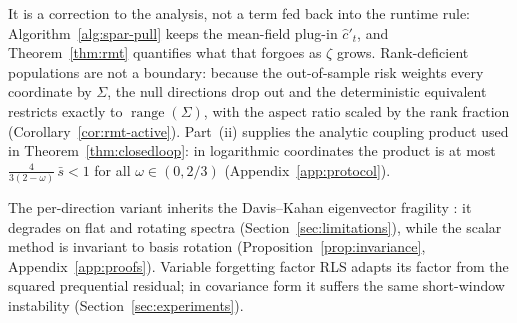 \documentclass[10pt]{article}
\begin{document}
It is a correction to the analysis, not a term fed back into the runtime rule: Algorithm~\ref{alg:spar-pull} keeps the mean-field plug-in $\hat c'_t$, and Theorem~\ref{thm:rmt} quantifies what that forgoes as $\zeta$ grows.
Rank-deficient populations are not a boundary: because the out-of-sample risk weights every coordinate by $\Sigma$, the null directions drop out and the deterministic equivalent restricts exactly to $\operatorname{range}(\Sigma)$, with the aspect ratio scaled by the rank fraction (Corollary~\ref{cor:rmt-active}).
Part~(ii) supplies the analytic coupling product used in Theorem~\ref{thm:closedloop}: in logarithmic coordinates the product is at most $\tfrac{4}{3(2-\omega)}\,\bar s < 1$ for all $\omega \in (0, 2/3)$ (Appendix~\ref{app:protocol}).

The per-direction variant inherits the Davis--Kahan eigenvector fragility \citep{davis1970,wedin1972}: it degrades on flat and rotating spectra (Section~\ref{sec:limitations}), while the scalar method is invariant to basis rotation (Proposition~\ref{prop:invariance}, Appendix~\ref{app:proofs}).
Variable forgetting factor RLS \citep{fortescue1981,paleologu2008} adapts its factor from the squared prequential residual; in covariance form it suffers the same short-window instability (Section~\ref{sec:experiments}).
\end{document}

